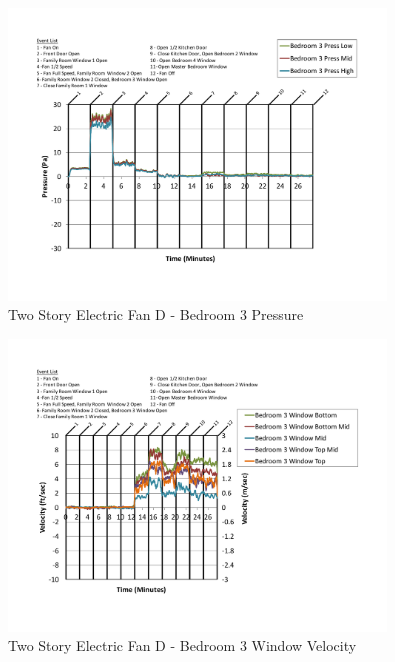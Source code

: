 \documentclass{article}
\begin{document}
\begin{appendices}
	\begin{figure}[H]
		\centering
		\includegraphics[height=3.05in,trim=0.67in 1.1in 0.67in 0.8in,clip=true]{0_Images/Results_Charts/ColdFlow/Two_Story/Electric/D/Bedroom_3_Pressure.pdf}
		\caption{Two Story Electric Fan D - Bedroom 3 Pressure}
	\end{figure}
 

	\begin{figure}[H]
		\centering
		\includegraphics[height=3.05in,trim=0.67in 1.1in 0.67in 0.8in,clip=true]{0_Images/Results_Charts/ColdFlow/Two_Story/Electric/D/Bedroom_3_Window_Velocity.pdf}
		\caption{Two Story Electric Fan D - Bedroom 3 Window Velocity}
	\end{figure}
 
	\clearpage


\end{appendices}
\end{document}
